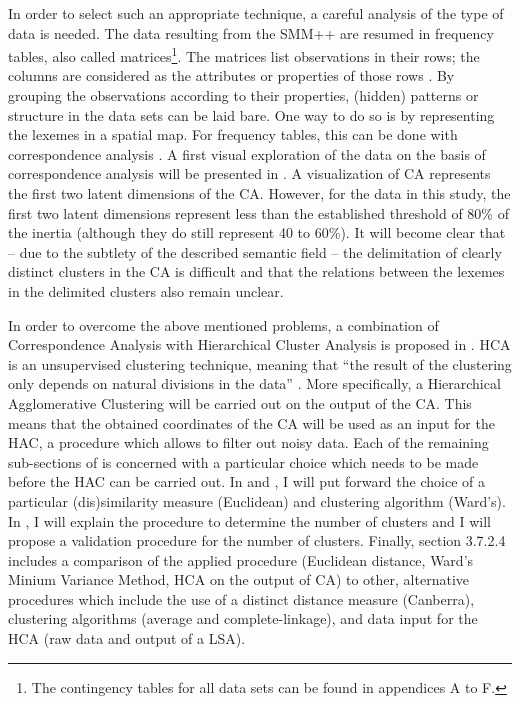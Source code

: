 In order to select such an appropriate technique, a careful analysis of the type of data is needed. The data resulting from the SMM++ are resumed in frequency tables, also called matrices\footnote{The contingency tables for all data sets can be found in appendices A to F.}. The matrices list observations in their rows; the columns are considered as the attributes or properties of those rows \citep[118]{baayen_analyzing_2008}. By grouping the observations according to their properties, (hidden) patterns or structure in the data sets can be laid bare. One way to do so is by representing the lexemes in a spatial map. For frequency tables, this can be done with correspondence analysis \citep{greenacre_correspondence_2007}. A first visual exploration of the data on the basis of correspondence analysis will be presented in . A visualization of CA represents the first two latent dimensions of the CA. However, for the data in this study, the first two latent dimensions represent less than the established threshold of 80\% of the inertia (although they do still represent 40 to 60\%). It will become clear that – due to the subtlety of the described semantic field – the delimitation of clearly distinct clusters in the CA is difficult and that the relations between the lexemes in the delimited clusters also remain unclear.

In order to overcome the above mentioned problems, a combination of Correspondence Analysis with Hierarchical Cluster Analysis is proposed in . HCA is an unsupervised clustering technique, meaning that “the result of the clustering only depends on natural divisions in the data” \citep[498]{manning_foundations_1999}. More specifically, a Hierarchical Agglomerative Clustering will be carried out on the output of the CA. This means that the obtained coordinates of the CA will be used as an input for the HAC, a procedure which allows to filter out noisy data. Each of the remaining sub-sections of  is concerned with a particular choice which needs to be made before the HAC can be carried out. In  and , I will put forward the choice of a particular (dis)similarity measure (Euclidean) and clustering algorithm (Ward’s). In , I will explain the procedure to determine the number of clusters and I will propose a validation procedure for the number of clusters. Finally, section 3.7.2.4 includes a comparison of the applied procedure (Euclidean distance, Ward’s Minium Variance Method, HCA on the output of CA) to other, alternative procedures which include the use of a distinct distance measure (Canberra), clustering algorithms (average and complete-linkage), and data input for the HCA (raw data and output of a LSA).

